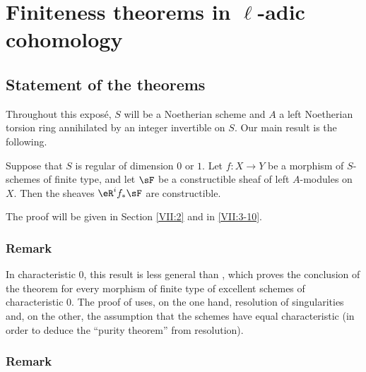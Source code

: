 \chapter{Finiteness theorems in \texorpdfstring{$\ell$}{l}-adic cohomology}\label{VII}











\section{Statement of the theorems}\label{VII:1}

Throughout this exposé, $S$ will be a Noetherian scheme and $A$ a left
Noetherian torsion ring annihilated by an integer invertible on $S$. Our main
result is the following.






\begin{theorem_}\label{VII:1-1}
Suppose that $S$ is regular of dimension $0$ or $1$. Let $f:X\to Y$ be a
morphism of $S$-schemes of finite type, and let $\sF$ be a constructible sheaf
of left $A$-modules on $X$. Then the sheaves $\eR^i f_\ast \sF$ are
constructible.
\end{theorem_}

The proof will be given in Section \ref{VII:2} and in \ref{VII:3-10}.






\subsection{Remark}\label{VII:1-2}

In characteristic $0$, this result is less general than
, which proves the conclusion of the theorem for
every morphism of finite type of excellent schemes of characteristic $0$.
The proof of  uses, on the one hand, resolution of
singularities and, on the other, the assumption that the schemes have equal
characteristic (in order to deduce the ``purity theorem'' from resolution).






\subsection{Remark}\label{VII:1-3}

